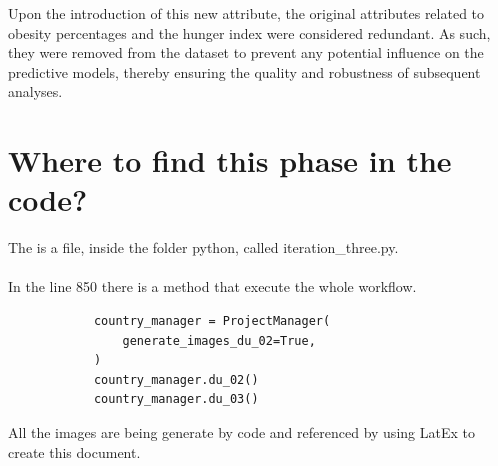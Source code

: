             Upon the introduction of this new attribute, the original attributes related to obesity percentages and the hunger index were considered redundant. As such, they were removed from the dataset to prevent any potential influence on the predictive models, thereby ensuring the quality and robustness of subsequent analyses.


    \section{Where to find this phase in the code?}

        The is a file, inside the folder python, called iteration\_three.py.
        \\
        \\
        In the line 850 there is a method that execute the whole workflow.

        \begin{verbatim}
            country_manager = ProjectManager(
                generate_images_du_02=True,
            )
            country_manager.du_02()
            country_manager.du_03()
        \end{verbatim}

        All the images are being generate by code and referenced by using LatEx to create this document.
